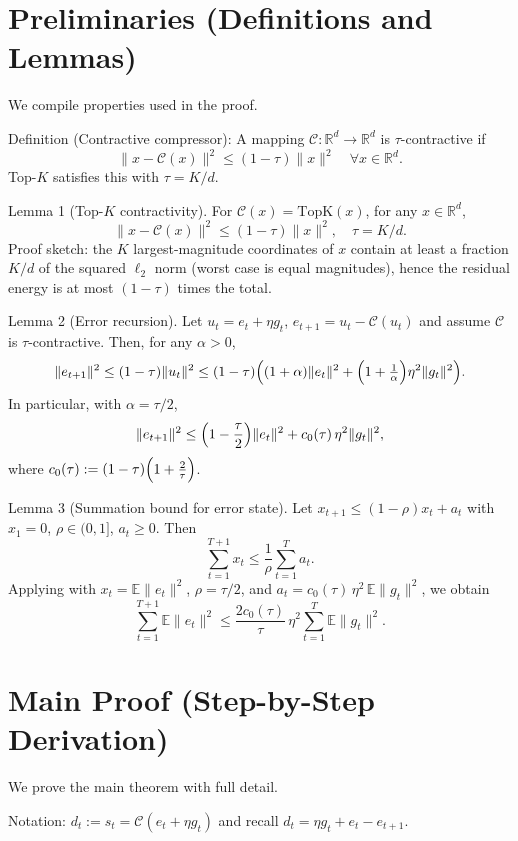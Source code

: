 \documentclass[11pt]{article}
\newcommand{\E}{\mathbb{E}}
\newcommand{\R}{\mathbb{R}}
\begin{document}
\section*{Preliminaries (Definitions and Lemmas)}
We compile properties used in the proof.

\noindent
Definition (Contractive compressor):
A mapping $\mathcal{C}:\R^d \to \R^d$ is $\tau$-contractive if
\[
\|x - \mathcal{C}(x)\|^2 \le (1-\tau)\|x\|^2\quad \forall x \in \R^d.
\]
Top-$K$ satisfies this with $\tau = K/d$.

\noindent
Lemma 1 (Top-$K$ contractivity).
For $\mathcal{C}(x) = \mathrm{TopK}(x)$, for any $x \in \R^d$,
\[
\|x - \mathcal{C}(x)\|^2 \le (1-\tau)\|x\|^2,\quad \tau = K/d.
\]
Proof sketch: the $K$ largest-magnitude coordinates of $x$ contain at least a fraction $K/d$ of the squared $\ell_2$ norm (worst case is equal magnitudes), hence the residual energy is at most $(1-\tau)$ times the total.

\noindent
Lemma 2 (Error recursion).
Let $u_t = e_t + \eta g_t$, $e_{t+1} = u_t - \mathcal{C}(u_t)$ and assume $\mathcal{C}$ is $\tau$-contractive. Then, for any $\alpha>0$,
\[
\|e_{t+1}\|^2 \le (1-\tau)\|u_t\|^2 \le (1-\tau)\Bigl((1+\alpha)\|e_t\|^2 + \Bigl(1+\tfrac{1}{\alpha}\Bigr)\eta^2\|g_t\|^2\Bigr).
\]
In particular, with $\alpha = \tau/2$,
\[
\|e_{t+1}\|^2 \le \Bigl(1-\frac{\tau}{2}\Bigr)\|e_t\|^2 + c_0(\tau)\,\eta^2 \|g_t\|^2,
\]
where $c_0(\tau) := (1-\tau)\Bigl(1 + \frac{2}{\tau}\Bigr)$.

\noindent
Lemma 3 (Summation bound for error state).
Let $x_{t+1} \le (1-\rho)x_t + a_t$ with $x_1=0$, $\rho \in (0,1]$, $a_t \ge 0$. Then
\[
\sum_{t=1}^{T+1} x_t \le \frac{1}{\rho}\sum_{t=1}^{T} a_t.
\]
Applying with $x_t=\E\|e_t\|^2$, $\rho=\tau/2$, and $a_t = c_0(\tau)\,\eta^2\,\E\|g_t\|^2$, we obtain
\[
\sum_{t=1}^{T+1} \E\|e_t\|^2 \le \frac{2 c_0(\tau)}{\tau}\,\eta^2 \sum_{t=1}^{T} \E\|g_t\|^2.
\]

\section*{Main Proof (Step-by-Step Derivation)}
We prove the main theorem with full detail.

Notation: $d_t := s_t = \mathcal{C}(e_t + \eta g_t)$ and recall $d_t = \eta g_t + e_t - e_{t+1}$.
\end{document}
